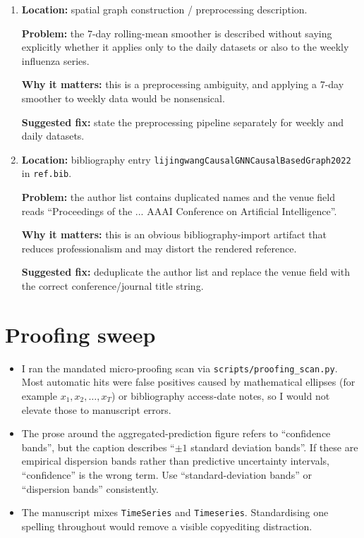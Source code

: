 \documentclass[11pt]{article}
\begin{document}
\begin{enumerate}
\textbf{Suggested fix:} write ``tied to three decimals'' or report more precision if there is a genuine lead.

\item \textbf{Location:} spatial graph construction / preprocessing description.

\textbf{Problem:} the 7-day rolling-mean smoother is described without saying explicitly whether it applies only to the daily datasets or also to the weekly influenza series.

\textbf{Why it matters:} this is a preprocessing ambiguity, and applying a 7-day smoother to weekly data would be nonsensical.

\textbf{Suggested fix:} state the preprocessing pipeline separately for weekly and daily datasets.

\item \textbf{Location:} bibliography entry \texttt{lijingwangCausalGNNCausalBasedGraph2022} in \texttt{ref.bib}.

\textbf{Problem:} the author list contains duplicated names and the venue field reads ``Proceedings of the ... AAAI Conference on Artificial Intelligence''.

\textbf{Why it matters:} this is an obvious bibliography-import artifact that reduces professionalism and may distort the rendered reference.

\textbf{Suggested fix:} deduplicate the author list and replace the venue field with the correct conference/journal title string.

\end{enumerate}

\section*{Proofing sweep}

\begin{itemize}
\item I ran the mandated micro-proofing scan via \texttt{scripts/proofing\_scan.py}. Most automatic hits were false positives caused by mathematical ellipses (for example $x_1, x_2, \ldots, x_T$) or bibliography access-date notes, so I would not elevate those to manuscript errors.
\item The prose around the aggregated-prediction figure refers to ``confidence bands'', but the caption describes ``$\pm 1$ standard deviation bands''. If these are empirical dispersion bands rather than predictive uncertainty intervals, ``confidence'' is the wrong term. Use ``standard-deviation bands'' or ``dispersion bands'' consistently.
\item The manuscript mixes \texttt{TimeSeries} and \texttt{Timeseries}. Standardising one spelling throughout would remove a visible copyediting distraction.
\end{itemize}
\end{document}
